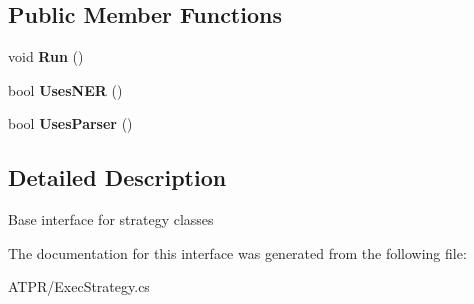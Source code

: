\subsection*{Public Member Functions}
\begin{DoxyCompactItemize}
\item 
\hypertarget{interface_a_t_p_r_1_1_exec_strategy_adcd52fae2702ce31b645ec8d149c0e51}{}\label{interface_a_t_p_r_1_1_exec_strategy_adcd52fae2702ce31b645ec8d149c0e51} 
void {\bfseries Run} ()
\item 
\hypertarget{interface_a_t_p_r_1_1_exec_strategy_acd32c810cb2247e7b058520cce7ed3cb}{}\label{interface_a_t_p_r_1_1_exec_strategy_acd32c810cb2247e7b058520cce7ed3cb} 
bool {\bfseries Uses\+N\+ER} ()
\item 
\hypertarget{interface_a_t_p_r_1_1_exec_strategy_a04e0c2d18b63468c4255c08182620726}{}\label{interface_a_t_p_r_1_1_exec_strategy_a04e0c2d18b63468c4255c08182620726} 
bool {\bfseries Uses\+Parser} ()
\end{DoxyCompactItemize}


\subsection{Detailed Description}
Base interface for strategy classes 



The documentation for this interface was generated from the following file\+:\begin{DoxyCompactItemize}
\item 
A\+T\+P\+R/Exec\+Strategy.\+cs\end{DoxyCompactItemize}
